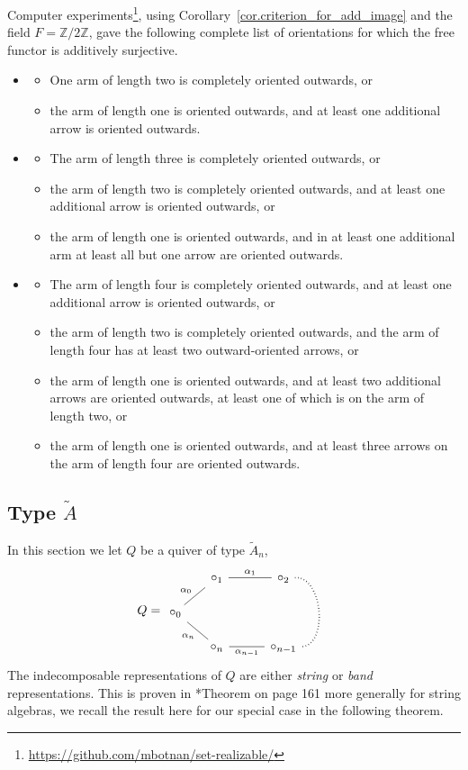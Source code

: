 \documentclass[a4paper]{amsart}
\theoremstyle{plain}
\theoremstyle{definition}
\theoremstyle{remark}
\newcommand{\Z}{\mathbb{Z}}
\begin{document}
Computer experiments\footnote{\url{https://github.com/mbotnan/set-realizable/}}, using Corollary~\ref{cor.criterion_for_add_image} and the field \( F = \Z /2\Z \), gave the following complete list of orientations for which the free functor is additively surjective.
\begin{itemize}
\item[\(E_6\)] 
\begin{itemize}
\item One arm of length two is completely oriented outwards, or
\item the arm of length one is oriented outwards, and at least one additional arrow is oriented outwards.
\end{itemize}
\item[\(E_7\)]
\begin{itemize}
\item The arm of length three is completely oriented outwards, or
\item the arm of length two is completely oriented outwards, and at least one additional arrow is oriented outwards, or
\item the arm of length one is oriented outwards, and in at least one additional arm at least all but one arrow are oriented outwards.
\end{itemize}
\item[\(E_8\)]
\begin{itemize}
\item The arm of length four is completely oriented outwards, and at least one additional arrow is oriented outwards, or
\item the arm of length two is completely oriented outwards, and the arm of length four has at least two outward-oriented arrows, or
\item the arm of length one is oriented outwards, and at least two additional arrows are oriented outwards, at least one of which is on the arm of length two, or
\item the arm of length one is oriented outwards, and at least three arrows on the arm of length four are oriented outwards.
\end{itemize}
\end{itemize}
\subsection{Type \texorpdfstring{$\widetilde{A}$}{A-tilde}} \label{subsec:Atilde}

In this section we let $Q$ be a quiver of type $\widetilde{A}_n$,  \[ Q = \begin{tikzcd}[sep=5mm]
& \circ_1 \ar[rr,-,"\alpha_1"] && \circ_2 \ar[dd,-,dotted,very thick,bend left=90] \\
\circ_0 \ar[ru,-,"\alpha_0"] \ar[rd,-,swap,"\alpha_n"] \\
& \circ_n \ar[rr,-,swap,"\alpha_{n-1}"] && \circ_{n-1}
\end{tikzcd} \]
The indecomposable representations of $Q$ are either \emph{string} or \emph{band} representations. This is proven in \cite{Butler-Ringel}*{Theorem on page 161} more generally for string algebras, we recall the result here for our special case in the following theorem.
\end{document}
